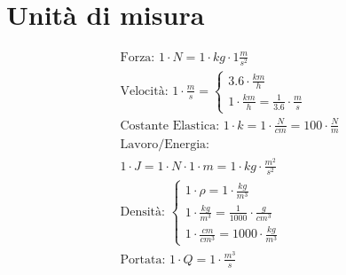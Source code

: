 \section{Unità di misura}

\begin{gather*}
  \text{Forza: } 1 \cdot N = 1 \cdot kg \cdot 1 \frac{m}{s^2} \\
  \text{Velocità: } 1 \cdot \frac{m}{s} = \begin{cases}
    3.6 \cdot \frac{km}{h} \\
1   \cdot \frac{km}{h} = \frac{1}{3.6} \cdot \frac{m}{s}
  \end{cases} \\
  \text{Costante Elastica: } 1 \cdot k = 1 \cdot \frac{N}{cm} = 100 \cdot \frac{N}{m} \\
  \text{Lavoro/Energia: } \\ 1 \cdot J = 1 \cdot N \cdot 1 \cdot m = 1 \cdot kg \cdot \frac{m^2}{s^2} \\
  \text{Densità: } \begin{cases}
    1 \cdot \rho = 1 \cdot \frac{kg}{m^3} \\
    1 \cdot \frac{kg}{m^3} = \frac{1}{1000} \cdot \frac{g}{cm^3} \\
    1 \cdot \frac{cm}{cm^3} = 1000 \cdot \frac{kg}{m^3}
  \end{cases} \\
  \text{Portata: } 1 \cdot Q = 1 \cdot \frac{m^3}{s}
\end{gather*}
